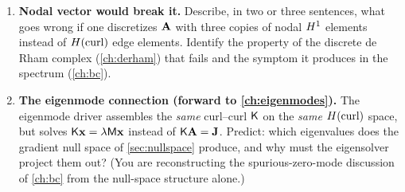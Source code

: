 \begin{enumerate}[label=\textbf{40.\arabic*}]
\item \textbf{Nodal vector would break it.} Describe, in two or three sentences, what
goes wrong if one discretizes $\mathbf{A}$ with three copies of nodal $H^1$ elements
instead of $H(\mathrm{curl})$ edge elements. Identify the property of the discrete de Rham
complex (\cref{ch:derham}) that fails and the symptom it produces in the spectrum
(\cref{ch:bc}).

\item \textbf{The eigenmode connection (forward to \cref{ch:eigenmodes}).} The
eigenmode driver assembles the \emph{same} curl--curl $\mathsf{K}$ on the \emph{same}
$H(\mathrm{curl})$ space, but solves $\mathsf{K}\mathbf{x}=\lambda\mathsf{M}\mathbf{x}$ instead of
$\mathsf{K}\mathbf{A}=\mathbf{J}$. Predict: which eigenvalues does the gradient null space of
\cref{sec:nullspace} produce, and why must the eigensolver project them out? (You
are reconstructing the spurious-zero-mode discussion of \cref{ch:bc} from the
null-space structure alone.)

\end{enumerate}
